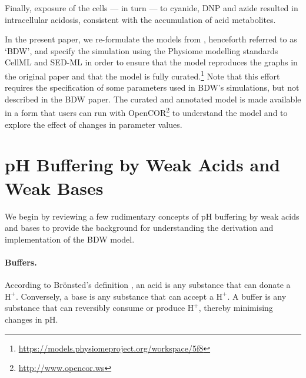 \documentclass[fleqn,10pt]{physiome}
\begin{document}
\begin{figure}[ht]
\end{figure}

Finally, exposure of the cells --- in turn --- to cyanide, DNP and azide resulted in intracellular acidosis, consistent with the accumulation of acid metabolites.

In the present paper, we re-formulate the models from \cite{boron1976intracellular}, henceforth referred to as `BDW', and specify the simulation using the Physiome modelling standards CellML \citep{cuellar2003overview} and SED-ML \citep{bergmann2017sed} in order to ensure that the model reproduces the graphs in the original paper and that the model is fully curated.\footnote{\url{https://models.physiomeproject.org/workspace/5f8}} Note that this effort requires the specification of some parameters used in BDW's simulations, but not described in the BDW paper. The curated and annotated model is made available in a form that users can run with OpenCOR\footnote{\url{http://www.opencor.ws}} to understand the model and to explore the effect of changes in parameter values.

\section{pH Buffering by Weak Acids and Weak Bases}

We begin by reviewing a few rudimentary concepts of $\mathrm{pH}$ buffering by weak acids and bases \citep{roos1981intracellular,bevensee2013control,boron2016medical} to provide the background for understanding the derivation and implementation of the BDW model.

\paragraph{Buffers.}

According to Br\"{o}nsted's definition \citep{bronsted1923einige}, an acid is any substance that can donate a $\mathrm{H^+}$. Conversely, a base is any substance that can accept a $\mathrm{H^+}$. A buffer is any substance that can reversibly consume or produce $\mathrm{H^+}$, thereby minimising changes in $\mathrm{pH}$.
\end{document}
